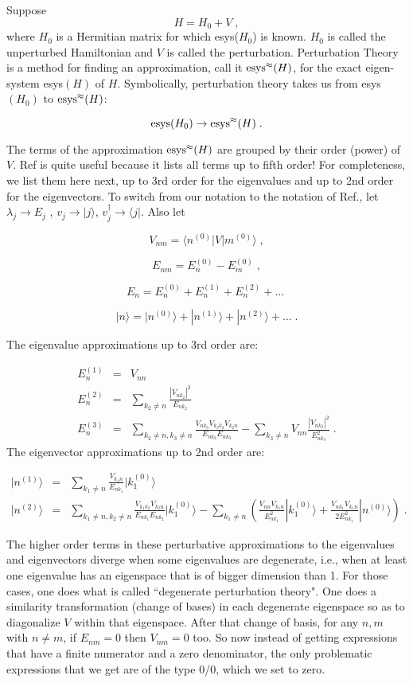 \documentclass[12pt]{article}%
\newcommand{\bra}[1]{\langle#1|}
\newcommand{\ket}[1]{|#1\rangle}
\newcommand{\beq}{\begin{equation}}
\newcommand{\eeq}{\end{equation}}
\newcommand{\beqa}{\begin{eqnarray}}
\newcommand{\eeqa}{\end{eqnarray}}
\newcommand{\rarrow}[0]{\rightarrow}
\newcommand{\lam}[0]{\lambda}
\begin{document}
Suppose
\beq H = H_0 + V
\;,
\eeq
where $H_0$ is a Hermitian matrix for which esys($H_0$)
is known. $H_0$ is called the unperturbed
Hamiltonian and $V$ is called
the perturbation.  Perturbation
Theory is a method for finding an
approximation, call it ${\rm esys}^\approx(H)$,
for the exact eigen-system esys$(H)$ of $H$.
Symbolically, perturbation theory
takes us from esys$(H_0)$
to ${\rm esys}^\approx(H)$:


\beq
{\rm esys}(H_0) \rarrow {\rm esys}^\approx(H)
\;.
\eeq


The terms of the approximation ${\rm esys}^\approx(H)$
are grouped by their order (power) of $V$.
Ref\cite{pert-wiki} is quite useful because
it lists all terms up to fifth order!
 For completeness, we
list them here next,
up to 3rd order for the eigenvalues
and up to 2nd order for the eigenvectors.
To switch from our notation to the notation
of Ref.\cite{pert-wiki}, let
$\lam_j \rarrow E_j$ , $v_j\rarrow \ket{j}$,
$v_j^\dag \rarrow \bra{j}$. Also let

\beq
V_{nm} = \bra{n^{(0)}} V \ket{m^{(0)}}
\;,
\eeq

\beq
E_{nm} = E^{(0)}_n - E^{(0)}_m
\;,
\eeq

\beq
E_n = E^{(0)}_n + E^{(1)}_n +  E^{(2)}_n +\ldots
\;
\eeq

\beq
\ket{n} = \ket{n^{(0)}} +
 \ket{n^{(1)}} +\ket{n^{(2)}} + \ldots
\;.
\eeq

The eigenvalue approximations
 up to 3rd order are:


\beqa
E^{(1)}_n &=& V_{nn}
\\
E^{(2)}_n &=& \sum_{k_2\neq n}\frac{|V_{nk_2}|^2}{E_{nk_2}}
\\
E^{(3)}_n &=&
\sum_{k_2\neq n, k_3\neq n}
\frac{V_{nk_3}V_{k_3k_2}V_{k_2n}}{E_{nk_2}E_{nk_3}}
-\sum_{k_3\neq n} V_{nn}\frac{|V_{nk_3}|^2}{E^2_{nk_3}}
\;.
\eeqa
The eigenvector approximations
up to 2nd order are:

\beqa
\ket{n^{(1)}} &=&
\sum_{k_1\neq n} \frac{V_{k_1n}}{E_{nk_1}}\ket{k^{(0)}_1}
\\
\ket{n^{(2)}}&=&
\sum_{k_1\neq n, k_2\neq n}
\frac{V_{k_1k_2}V_{k_2n}}{E_{nk_1}E_{nk_2}}\ket{k_1^{(0)}}
- \sum_{k_1\neq n}\left(
\frac{V_{nn}V_{k_1n}}{E^2_{nk_1}}\ket{k^{(0)}_1}
+ \frac{V_{nk_1}V_{k_1n}}{2E_{nk_1}^2}\ket{n^{(0)}}
\right)
\;.
\eeqa

The higher order terms in
these perturbative approximations
to the eigenvalues and eigenvectors
diverge
when  some eigenvalues are degenerate,
i.e., when at least one eigenvalue
has an eigenspace that is of bigger
dimension than 1. For those cases,
one does what is called
``degenerate perturbation theory".
One does a similarity transformation
(change of bases) in each degenerate
eigenspace so as to diagonalize $V$
within that eigenspace.
After that change of
basis, for any $n,m$ with $n\neq m$,
if $E_{nm}=0$ then $V_{nm}=0$ too.
So now instead of getting expressions
that have a finite numerator and a zero
denominator, the
only problematic expressions that we get are
of the type 0/0, which we set to zero.
\end{document}
